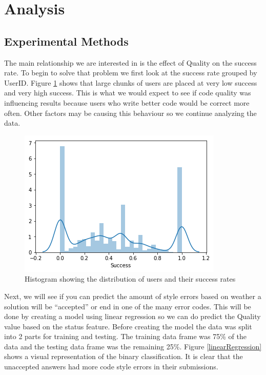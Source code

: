 \documentclass{article}
\begin{document}
\section{Analysis}\label{analysis}

\subsection{Experimental Methods}\label{experimental-methods}

The main relationship we are interested in is the effect of Quality on
the success rate. To begin to solve that problem we first look at the
success rate grouped by UserID. Figure \ref{uservsuccess} shows that
large chunks of users are placed at very low success and very high
success. This is what we would expect to see if code quality was
influencing results because users who write better code would be correct
more often. Other factors may be causing this behaviour so we continue
analyzing the data.

\begin{figure}[ht] \vskip 0.2in \begin{center}
\centerline{\includegraphics[width=\columnwidth]{../images/UserVsSuccess.png}}
\caption{ Histogram showing the distribution of users and their success rates } \label{uservsuccess} \end{center} \vskip -0.2in \end{figure}

Next, we will see if you can predict the amount of style errors based on
weather a solution will be ``accepted'' or end in one of the many error
codes. This will be done by creating a model using linear regression so
we can do predict the Quality value based on the status feature. Before
creating the model the data was split into 2 parts for training and
testing. The training data frame was 75\% of the data and the testing
data frame was the remaining 25\%. Figure \ref{linearRegression} shows a
visual representation of the binary classification. It is clear that the
unaccepted answers had more code style errors in their submissions.
\end{document}
